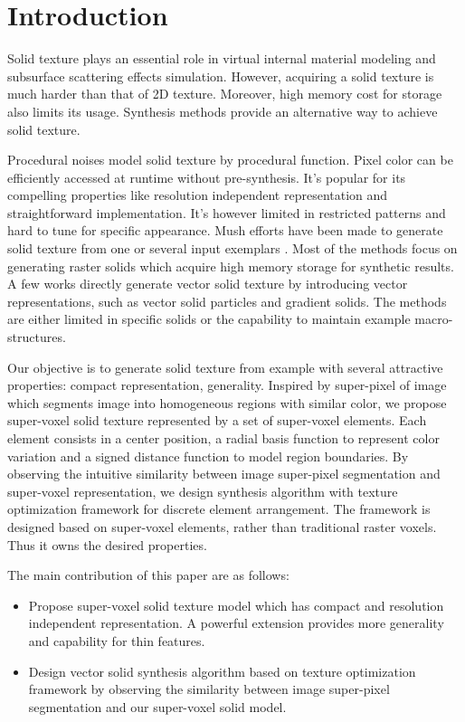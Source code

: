 \section{Introduction}
Solid texture plays an essential role in virtual internal material modeling and subsurface scattering effects simulation. However, acquiring a solid texture is much harder than that of 2D texture. Moreover, high memory cost for storage also limits its usage. Synthesis methods provide an alternative way to achieve solid texture. 

Procedural noises \cite{perlin1985image} model solid texture by procedural function. Pixel color can be efficiently accessed at runtime without pre-synthesis. It's popular for its compelling properties like resolution independent representation and straightforward implementation. It's however limited in restricted patterns and hard to tune for specific appearance. Mush efforts have been made to generate solid texture from one or several input exemplars \cite{kopf2007solid,du2013semiregular}. Most of the methods focus on generating raster solids which acquire high memory storage for synthetic results. A few works \cite{zhang2013efficient,shu2014efficient} directly generate vector solid texture by introducing vector representations, such as vector solid particles and gradient solids. The methods are either limited in specific solids or the capability to maintain example macro-structures. 

 Our objective is to generate solid texture from example with several attractive properties: compact representation, generality. Inspired by super-pixel of image which segments image into homogeneous regions with similar color, we propose super-voxel solid texture represented by a set of super-voxel elements. Each element consists in a center position, a radial basis function to represent color variation and a signed distance function to model region boundaries.  By observing the intuitive similarity between image super-pixel segmentation and super-voxel representation, we design synthesis algorithm with texture optimization framework for discrete element arrangement. The framework is designed based on super-voxel elements, rather than traditional raster voxels. Thus it owns the desired properties. 

The main contribution of this paper are as follows:
\begin{itemize}
	\item Propose super-voxel solid texture model which has compact and resolution independent representation. A powerful extension provides more generality and capability for thin features. 
	\item Design vector solid synthesis algorithm based on texture optimization framework by observing the similarity between image super-pixel segmentation and our super-voxel solid model.
\end{itemize}